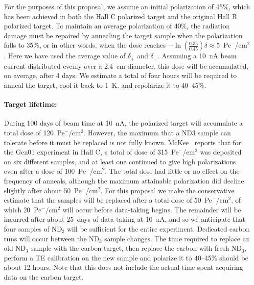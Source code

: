 For the purposes of this proposal, we assume an initial polarization of 45\%, 
which has been achieved in both the Hall C polarized target and the original Hall B
polarized target.  To maintain an average polarization of 40\%, the radiation 
damage must be repaired by annealing the target sample when the polarization 
falls to 35\%, or in other words, when the dose reaches 
$\minus \ln(\frac{0.35}{0.45})\delta \approx 5$~Pe$^{\minus}$/cm$^2$.  
Here we have used the average value of $\delta_{\plus}$ and $\delta_{\minus}$.  
Assuming a 10~nA beam current distributed evenly over a 2.4~cm diameter, 
this dose will be accumulated, on average, after 4 days.  We estimate a total of four
hours will be required to anneal the target, cool it back to 1~K, and repolarize it to 40--45\%.

\vspace{-.15in}
\paragraph{Target lifetime:}
During 100 days of beam time at 10~nA, the polarized target
will accumulate a total dose of 120~Pe$^-$/cm$^2$.
However, the maximum that a ND$3$ sample can tolerate before it must be replaced is not fully known.  
McKee~\cite{McKee2004} reports that for the Gen01 experiment in Hall C, a total of dose of
315~Pe$^{\minus}$/cm$^2$ was deposited on six different samples, and at least one continued to give high polarizations even after a dose of 100~Pe$^{\minus}$/cm$^2$.  The total dose had little or no effect on the frequency of anneals, although the maximum attainable polarization did decline slightly after about 
50~Pe$^{\minus}$/cm$^2$.   For this proposal we make the conservative estimate that the samples will be replaced after a total dose of 50~Pe$^{\minus}$/cm$^2$, of which 20~Pe$^{\minus}$/cm$^2$
will occur before data-taking begins.  The remainder will be incurred after about
25~days of data-taking at 10~nA, and so we anticipate that four samples of ND$_3$ will be sufficient 
for the entire experiment.  Dedicated carbon runs will occur between the ND$_3$ sample changes.
The time required to replace an old ND$_3$ sample with the carbon target, then replace the carbon with fresh
ND$_3$, perform a TE calibration on the new sample and polarize it to 40--45\% should be about 12 hours. Note that this does not include the actual time spent acquiring data on the carbon target.

\vspace{-.15in}
